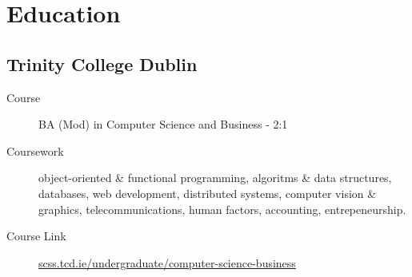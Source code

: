 \section*{Education}

\subsection*{Trinity College Dublin}
\begin{description}
  \item[Course] BA (Mod) in Computer Science and Business - 2:1
  \item[Coursework] object-oriented \& functional programming, algoritms \& data structures, databases, web development, distributed systems, computer vision \& graphics, telecommunications, human factors, accounting, entrepeneurship.
  \item[Course Link] \href{https://www.scss.tcd.ie/undergraduate/computer-science-business/}{scss.tcd.ie/undergraduate/computer-science-business}
\end{description}
